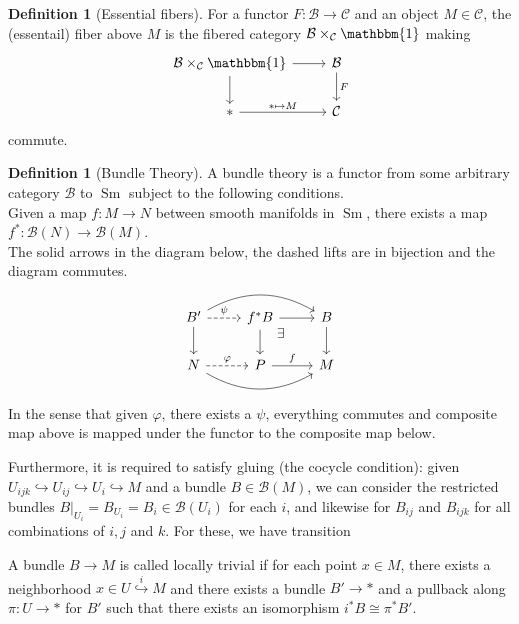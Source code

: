 \documentclass[reqno]{amsart}
\theoremstyle{definition}
\newtheorem{definition}[theorem]{Definition}
\theoremstyle{remark}
\DeclareMathOperator{\Sm}{Sm}
\begin{document}
    \begin{definition}[Essential fibers]
        For a functor
        $F \colon \mathcal{B} \to \mathcal{C}$ and an object
        $M \in \mathcal{C}$, the (essentail) fiber above $M$ is
        the fibered category
        $\mathcal{B} \times_{\mathcal{C}}\mathbbm{1}$ making
        \begin{equation*}
        \begin{tikzcd}
            \mathcal{B}\times_{\mathcal{C}} \mathbbm{1}
            \ar[d] \ar[r] & \mathcal{B} \ar[d, "F"] \\
            * \ar[r, "* \mapsto M"] & \mathcal{C}
        \end{tikzcd}
        \end{equation*}
        commute.
    \end{definition}


    \begin{definition}[Bundle Theory]
    A bundle theory is a functor from some
    arbitrary category $\mathcal{B}$ to $\Sm$ subject to the
    following conditions.\\
    Given a map $f \colon M \to N$ between smooth manifolds in
    $\Sm$, there exists a map
    $f^{*} \colon \mathcal{B}(N) \to \mathcal{B}(M)$.\\
    The solid arrows in the diagram below, the
    dashed lifts are in bijection and the diagram commutes.
    \begin{equation*}
    \begin{tikzcd}
        B' \ar[rr, bend left]
        \ar[d] \ar[r, dashed, "\psi "] & f^{*}B \ar[r]
        \ar[dr, phantom, "\exists", very near start]
        \ar[d]& B \ar[d]\\
        N \ar[r, dashed, "\varphi "] \ar[rr, bend right]
                         & P \ar[r, "f"] & M
    \end{tikzcd}
    \end{equation*}
    In the sense that given
    $\varphi $, there exists
    a $\psi $, everything commutes and
    composite map above is mapped under the functor
    to the composite map below. 

    Furthermore, it is required to satisfy gluing (the cocycle condition):
    given
    $U_{ijk} \hookrightarrow U_{ij} 
    \hookrightarrow U_i \hookrightarrow M$ 
    and a bundle
    $B \in \mathcal{B}(M)$,
    we can consider the restricted bundles
    $B|_{U_i} = B_{U_i} = B_i 
    \in \mathcal{B}(U_i)$ for each $i$, and likewise
    for $B_{ij}$ and
    $B_{ijk}$ for all combinations of 
    $i,j$ and $k$.
    For these, we have transition
    

    A bundle $B \to M$ is called locally trivial if
    for each point $x \in M$, there exists
    a neighborhood $x \in U \stackrel{i}{\hookrightarrow} M$
    and there exists a bundle $B' \to *$ 
    and a pullback along $\pi \colon
    U \to *$ for $B'$ such that
    there exists an isomorphism
    $i^{*}B \cong \pi^{*}B'$.
    \end{definition}
    
\end{document}
